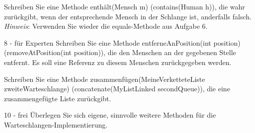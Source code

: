 \documentclass{article}
\begin{document}
\begin{task}{7}
    Schreiben Sie eine Methode enthält(Mensch m) (contains(Human h)), die wahr zurückgibt, wenn 
    der entsprechende Mensch in der Schlange ist, anderfalls falsch. \\
    \textit{Hinweis}: Verwenden Sie wieder die equals-Methode aus Aufgabe 6.
\end{task}
\begin{task}{8 - für Experten}
    Schreiben Sie eine Methode entferneAnPosition(int position) (removeAtPosition(int position)), die den 
    Menschen an der gegebenen Stelle entfernt. Es soll eine Referenz zu diesem Menschen zurückgegeben werden. \\
\end{task}
\begin{task}{9}
    Schreiben Sie eine Methode zusammenfügen(MeineVerketteteListe zweiteWarteschlange) (concatenate(MyListLinked secondQueue)),
    die eine zusammengefügte Liste zurückgibt. 
\end{task}
\begin{task}{10 - frei}
    Überlegen Sie sich eigene, sinnvolle weitere Methoden für die Warteschlangen-Implementierung.
\end{task}

\newpage
\end{document}
